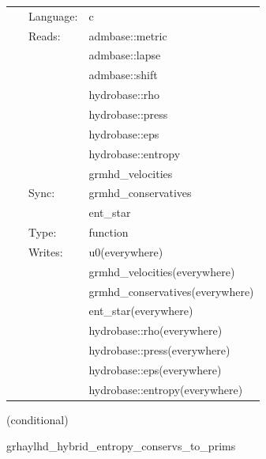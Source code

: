 \documentclass{article}
\begin{document}
 \begin{tabular*}{160mm}{cll} 
~ & Language:  & c \\ 
~ & Reads:  & admbase::metric \\ 
~& ~ &admbase::lapse\\ 
~& ~ &admbase::shift\\ 
~& ~ &hydrobase::rho\\ 
~& ~ &hydrobase::press\\ 
~& ~ &hydrobase::eps\\ 
~& ~ &hydrobase::entropy\\ 
~& ~ &grmhd\_velocities\\ 
~ & Sync:  & grmhd\_conservatives \\ 
~& ~ &ent\_star\\ 
~ & Type:  & function \\ 
~ & Writes:  & u0(everywhere) \\ 
~& ~ &grmhd\_velocities(everywhere)\\ 
~& ~ &grmhd\_conservatives(everywhere)\\ 
~& ~ &ent\_star(everywhere)\\ 
~& ~ &hydrobase::rho(everywhere)\\ 
~& ~ &hydrobase::press(everywhere)\\ 
~& ~ &hydrobase::eps(everywhere)\\ 
~& ~ &hydrobase::entropy(everywhere)\\ 
\end{tabular*} 


\vspace{5mm}

   (conditional) 

\hspace{5mm} grhaylhd\_hybrid\_entropy\_conservs\_to\_prims 

\hspace{5mm}{\it entropy+hybrid version of grhaylhd\_conservs\_to\_prims } 


\hspace{5mm}
\end{document}
